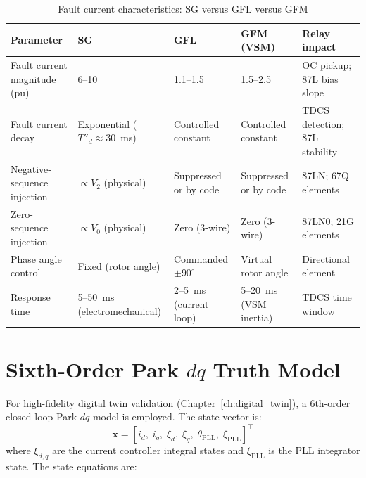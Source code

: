 \begin{table}[htbp]
\caption{Fault current characteristics: SG versus GFL versus GFM}
\label{tab:ch2_fault_comparison}
\footnotesize\setlength{\tabcolsep}{4pt}%
\begin{tabularx}{\textwidth}{@{}p{3.8cm}p{2.7cm}p{2.7cm}p{2.3cm}X@{}}
\toprule
Parameter & SG & GFL & GFM (VSM) & Relay impact \\
\midrule
Fault current magnitude (pu) & 6--10 & 1.1--1.5 & 1.5--2.5
  & OC pickup; 87L bias slope \\
Fault current decay & Exponential ($T''_d \approx 30$~ms) & Controlled constant
  & Controlled constant
  & TDCS detection; 87L stability \\
Negative-sequence injection & $\propto V_2$ (physical) & Suppressed or by code
  & Suppressed or by code
  & 87LN; 67Q elements \\
Zero-sequence injection & $\propto V_0$ (physical) & Zero (3-wire)
  & Zero (3-wire)
  & 87LN0; 21G elements \\
Phase angle control & Fixed (rotor angle) & Commanded $\pm 90^\circ$
  & Virtual rotor angle
  & Directional element \\
Response time & 5--50~ms (electromechanical) & 2--5~ms (current loop)
  & 5--20~ms (VSM inertia)
  & TDCS time window \\
\bottomrule
\end{tabularx}
\end{table}

\section{Sixth-Order Park \texorpdfstring{$dq$}{dq} Truth Model}
\label{sec:ch2_park6}

For high-fidelity digital twin validation (Chapter~\ref{ch:digital_twin}),
a 6th-order closed-loop Park $dq$ model is employed. The state vector is:
\begin{equation}
  \mathbf{x} = [i_d,\; i_q,\; \xi_d,\; \xi_q,\; \theta_\mathrm{PLL},\; \xi_\mathrm{PLL}]^\top
  \label{eq:ch2_park6_state}
\end{equation}
where $\xi_{d,q}$ are the current controller integral states and
$\xi_\mathrm{PLL}$ is the PLL integrator state. The state equations are:

